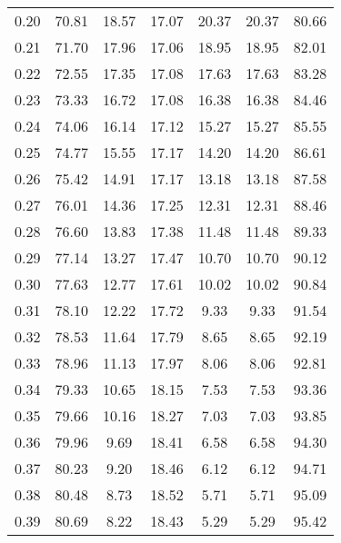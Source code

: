 \begin{tabular}{|c|c|c|c|c|c|c|}
      0.20 &     70.81 &     18.57 &      17.07 &   20.37 &      20.37 &         80.66 \\
      0.21 &     71.70 &     17.96 &      17.06 &   18.95 &      18.95 &         82.01 \\
      0.22 &     72.55 &     17.35 &      17.08 &   17.63 &      17.63 &         83.28 \\
      0.23 &     73.33 &     16.72 &      17.08 &   16.38 &      16.38 &         84.46 \\
      0.24 &     74.06 &     16.14 &      17.12 &   15.27 &      15.27 &         85.55 \\
      0.25 &     74.77 &     15.55 &      17.17 &   14.20 &      14.20 &         86.61 \\
      0.26 &     75.42 &     14.91 &      17.17 &   13.18 &      13.18 &         87.58 \\
      0.27 &     76.01 &     14.36 &      17.25 &   12.31 &      12.31 &         88.46 \\
      0.28 &     76.60 &     13.83 &      17.38 &   11.48 &      11.48 &         89.33 \\
      0.29 &     77.14 &     13.27 &      17.47 &   10.70 &      10.70 &         90.12 \\
      0.30 &     77.63 &     12.77 &      17.61 &   10.02 &      10.02 &         90.84 \\
      0.31 &     78.10 &     12.22 &      17.72 &    9.33 &       9.33 &         91.54 \\
      0.32 &     78.53 &     11.64 &      17.79 &    8.65 &       8.65 &         92.19 \\
      0.33 &     78.96 &     11.13 &      17.97 &    8.06 &       8.06 &         92.81 \\
      0.34 &     79.33 &     10.65 &      18.15 &    7.53 &       7.53 &         93.36 \\
      0.35 &     79.66 &     10.16 &      18.27 &    7.03 &       7.03 &         93.85 \\
      0.36 &     79.96 &      9.69 &      18.41 &    6.58 &       6.58 &         94.30 \\
      0.37 &     80.23 &      9.20 &      18.46 &    6.12 &       6.12 &         94.71 \\
      0.38 &     80.48 &      8.73 &      18.52 &    5.71 &       5.71 &         95.09 \\
      0.39 &     80.69 &      8.22 &      18.43 &    5.29 &       5.29 &         95.42 \\

\end{tabular}
